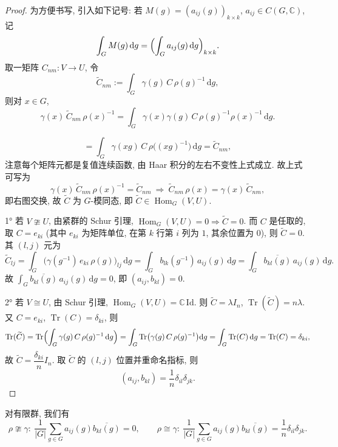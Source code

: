 \begin{proof}
为方便书写, 引入如下记号: 若 $M(g)=(a_{ij}(g))_{k\times k}$, $a_{ij}\in C(G,\mathbb{C})$, 记
\[
  \int_G M(g)\,\mathrm{d}g=\Bigl(\int_G a_{ij}(g)\,\mathrm{d}g\Bigr)_{k\times k}.
\]
取一矩阵 $C_{nm}\colon V\to U$, 令
\[
\widetilde C_{nm}:=\int_G\gamma(g)\,C\,\rho(g)^{-1}\,\mathrm{d}g,
\]
则对 $x\in G$,
\[
  \gamma(x)\,\widetilde C_{nm}\,\rho(x)^{-1}
  =\int_G\gamma(x)\gamma(g)\,C\,\rho(g)^{-1}\rho(x)^{-1}\,\mathrm{d}g .
\]

\[
  =\int_G\gamma(xg)\,C\,\rho\bigl((xg)^{-1}\bigr)\,\mathrm{d}g
  =\widetilde C_{nm},
\]
注意每个矩阵元都是复值连续函数, 由 Haar 积分的左右不变性上式成立. 故上式可写为
\[
  \gamma(x)\,\widetilde C_{nm}\,\rho(x)^{-1}=\widetilde C_{nm}
  \ \Longrightarrow\
  \widetilde C_{nm}\,\rho(x)=\gamma(x)\,\widetilde C_{nm},
\]
即右图交换, 故 $\widetilde C$ 为 $G$-模同态, 即 $\widetilde C\in\operatorname{Hom}_G(V,U)$.

1° 若 $V\ncong U$, 由紧群的 Schur 引理, $\operatorname{Hom}_G(V,U)=0\Rightarrow\widetilde C=0$.
而 $C$ 是任取的, 取 $C=e_{ki}$ (其中 $e_{ki}$ 为矩阵单位, 在第 $k$ 行第 $i$ 列为 $1$,
其余位置为 $0$), 则 $\widetilde C=0$. 其 $(l,j)$ 元为
\[
  \widetilde C_{lj}=\int_G\bigl(\gamma(g^{-1})\,e_{ki}\,\rho(g)\bigr)_{lj}\,\mathrm{d}g
  =\int_G b_{lk}(g^{-1})\,a_{ij}(g)\,\mathrm{d}g
  =\int_G\overline{b_{kl}(g)}\,a_{ij}(g)\,\mathrm{d}g .
\]
故 $\displaystyle\int_G\overline{b_{kl}(g)}\,a_{ij}(g)\,\mathrm{d}g=0$, 即 $(a_{ij},b_{kl})=0$.

2° 若 $V\cong U$, 由 Schur 引理, $\operatorname{Hom}_G(V,U)=\mathbb{C}\,\mathrm{Id}$.
则 $\widetilde C=\lambda I_n$, $\operatorname{Tr}(\widetilde C)=n\lambda$. 又 $C=e_{ki}$, $\operatorname{Tr}(C)=\delta_{ki}$, 则
\[
  \operatorname{Tr}(\widetilde C)=\operatorname{Tr}\Bigl(\int_G\gamma(g)\,C\,\rho(g)^{-1}\,\mathrm{d}g\Bigr)
  =\int_G\operatorname{Tr}\bigl(\gamma(g)\,C\,\rho(g)^{-1}\bigr)\mathrm{d}g
  =\int_G\operatorname{Tr}(C)\,\mathrm{d}g=\operatorname{Tr}(C)=\delta_{ki},
\]
故 $\widetilde C=\dfrac{\delta_{ki}}{n}I_n$. 取 $\widetilde C$ 的 $(l,j)$ 位置并重命名指标, 则
\[
  (a_{ij},b_{kl})=\frac{1}{n}\delta_{il}\delta_{jk}.
\]
\end{proof}

\begin{remark}\label{rem:orthogonality-relations}
对有限群, 我们有
\[
  \rho\ncong\gamma:\ \frac{1}{|G|}\sum_{g\in G}a_{ij}(g)\overline{b_{kl}(g)}=0,
  \qquad
  \rho\cong\gamma:\ \frac{1}{|G|}\sum_{g\in G}a_{ij}(g)\overline{b_{kl}(g)}
  =\frac{1}{n}\delta_{il}\delta_{jk}.
\]
\end{remark}

